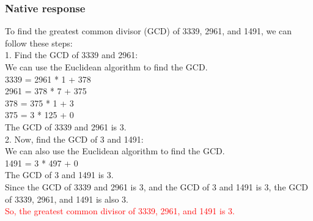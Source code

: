 



\subsubsection*{Native response}

\begin{tcolorbox}[colback=gray!5, colframe=black, arc=2pt, boxrule=0.5pt,]
To find the greatest common divisor (GCD) of 3339, 2961, and 1491, we can follow these steps:\\

1. Find the GCD of 3339 and 2961:\\

   We can use the Euclidean algorithm to find the GCD.\\

   3339 = 2961 * 1 + 378\\
2961 = 378 * 7 + 375\\
378 = 375 * 1 + 3\\
375 = 3 * 125 + 0\\

The GCD of 3339 and 2961 is 3.\\

2. Now, find the GCD of 3 and 1491:\\
We can also use the Euclidean algorithm to find the GCD.\\

1491 = 3 * 497 + 0\\

The GCD of 3 and 1491 is 3.\\

Since the GCD of 3339 and 2961 is 3, and the GCD of 3 and 1491 is 3, the GCD of 3339, 2961, and 1491 is also 3.\\

\textcolor{red}{So, the greatest common divisor of 3339, 2961, and 1491 is 3.}\\
\end{tcolorbox}

